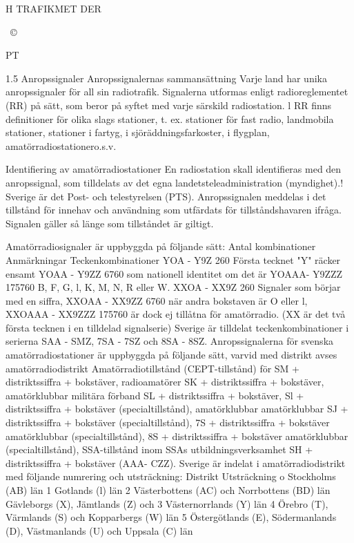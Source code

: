 \documentclass[a4paper,twoside,twocolumn,openright]{book}
\begin{document}
{{{{{H TRAFIKMET DER

~©~

PT

1.5 Anropssignaler
Anropssignalernas sammansättning
Varje land har unika anropssignaler för all
sin radiotrafik. Signalerna utformas enligt
radioreglementet (RR) på sätt, som beror på
syftet med varje särskild radiostation. l RR
finns definitioner för olika slags stationer,
t. ex. stationer för fast radio, landmobila stationer, stationer i fartyg, i sjöräddningsfarkoster, i flygplan, amatörradiostationero.s.v.

Identifiering av amatörradiostationer
En radiostation skall identifieras med den
anropssignal, som tilldelats av det egna landetsteleadministration (myndighet).! Sverige
är det Post- och telestyrelsen (PTS).
Anropssignalen meddelas i det tillstånd för
innehav och användning som utfärdats för
tillståndshavaren ifråga. Signalen gäller så
länge som tillståndet är giltigt.

Amatörradiosignaler är uppbyggda på följande sätt:
Antal kombinationer Anmärkningar
Teckenkombinationer
YOA - Y9Z
260
Första tecknet "Y" räcker ensamt
YOAA - Y9ZZ
6760
som nationell identitet om det är
YOAAA- Y9ZZZ
175760
B, F, G, l, K, M, N, R eller W.
XXOA - XX9Z
260
Signaler som börjar med en siffra,
XXOAA - XX9ZZ
6760
när andra bokstaven är O eller l,
XXOAAA - XX9ZZZ
175760
är dock ej tillåtna för amatörradio.
(XX är det två första tecknen i en tilldelad signalserie)
Sverige är tilldelat teckenkombinationer i serierna SAA - SMZ, 7SA - 7SZ och 8SA - 8SZ.
Anropssignalerna för svenska amatörradiostationer är uppbyggda på följande sätt, varvid
med distrikt avses amatörradiodistrikt
Amatörradiotillstånd (CEPT-tillstånd) för
SM + distriktssiffra + bokstäver,
radioamatörer
SK + distriktssiffra + bokstäver,
amatörklubbar
militära förband
SL + distriktssiffra + bokstäver,
Sl + distriktssiffra + bokstäver
(specialtillstånd),
amatörklubbar
amatörklubbar
SJ + distriktssiffra + bokstäver
(specialtillstånd),
7S + distriktssiffra + bokstäver
amatörklubbar
(specialtillstånd),
8S + distriktssiffra + bokstäver
amatörklubbar
(specialtillstånd),
SSA-tillstånd inom SSAs utbildningsverksamhet
SH + distriktssiffra + bokstäver (AAA- CZZ).
Sverige är indelat i amatörradiodistrikt med följande numrering och utsträckning:
Distrikt Utsträckning
o Stockholms (AB) län
1
Gotlands (l) län
2
Västerbottens (AC) och
Norrbottens (BD) län
Gävleborgs (X), Jämtlands (Z) och
3
Västernorrlands (Y) län
4
Örebro (T), Värmlands (S) och
Kopparbergs (W) län
5
Östergötlands (E), Södermanlands
(D), Västmanlands (U) och Uppsala
(C) län

}}}}}
\end{document}

